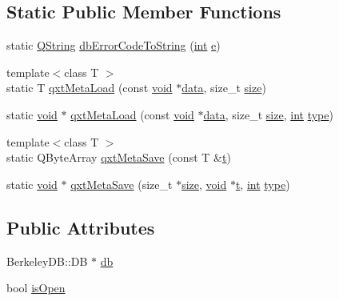 \subsection*{Static Public Member Functions}
\begin{DoxyCompactItemize}
\item 
static \hyperlink{group___u_a_v_objects_plugin_gab9d252f49c333c94a72f97ce3105a32d}{Q\-String} \hyperlink{class_qxt_bdb_a41630ef9d1adeb157e90bc645014ddec}{db\-Error\-Code\-To\-String} (\hyperlink{ioapi_8h_a787fa3cf048117ba7123753c1e74fcd6}{int} \hyperlink{_o_p_plots_8m_a9425be9aab51621e317ba7ade564b570}{e})
\item 
{\footnotesize template$<$class T $>$ }\\static T \hyperlink{class_qxt_bdb_a4a3f247160b1ed79cb0dcceacd9fb7f0}{qxt\-Meta\-Load} (const \hyperlink{group___u_a_v_objects_plugin_ga444cf2ff3f0ecbe028adce838d373f5c}{void} $\ast$\hyperlink{glext_8h_a8850df0785e6fbcc2351af3b686b8c7a}{data}, size\-\_\-t \hyperlink{glext_8h_a014d89bd76f74ef3a29c8f04b473eb76}{size})
\item 
static \hyperlink{group___u_a_v_objects_plugin_ga444cf2ff3f0ecbe028adce838d373f5c}{void} $\ast$ \hyperlink{class_qxt_bdb_a2f0bcad0f2a2de525873ee7af8876cd0}{qxt\-Meta\-Load} (const \hyperlink{group___u_a_v_objects_plugin_ga444cf2ff3f0ecbe028adce838d373f5c}{void} $\ast$\hyperlink{glext_8h_a8850df0785e6fbcc2351af3b686b8c7a}{data}, size\-\_\-t \hyperlink{glext_8h_a014d89bd76f74ef3a29c8f04b473eb76}{size}, \hyperlink{ioapi_8h_a787fa3cf048117ba7123753c1e74fcd6}{int} \hyperlink{glext_8h_a7d05960f4f1c1b11f3177dc963a45d86}{type})
\item 
{\footnotesize template$<$class T $>$ }\\static Q\-Byte\-Array \hyperlink{class_qxt_bdb_a50b3805cd1450b1f3be5e76bd3bbd7ca}{qxt\-Meta\-Save} (const T \&\hyperlink{glext_8h_a00140d6f5c548b26daf170bf16e86a6d}{t})
\item 
static \hyperlink{group___u_a_v_objects_plugin_ga444cf2ff3f0ecbe028adce838d373f5c}{void} $\ast$ \hyperlink{class_qxt_bdb_aa77852815da418ec1c49d497397ff9e1}{qxt\-Meta\-Save} (size\-\_\-t $\ast$\hyperlink{glext_8h_a014d89bd76f74ef3a29c8f04b473eb76}{size}, \hyperlink{group___u_a_v_objects_plugin_ga444cf2ff3f0ecbe028adce838d373f5c}{void} $\ast$\hyperlink{glext_8h_a00140d6f5c548b26daf170bf16e86a6d}{t}, \hyperlink{ioapi_8h_a787fa3cf048117ba7123753c1e74fcd6}{int} \hyperlink{glext_8h_a7d05960f4f1c1b11f3177dc963a45d86}{type})
\end{DoxyCompactItemize}
\subsection*{Public Attributes}
\begin{DoxyCompactItemize}
\item 
Berkeley\-D\-B\-::\-D\-B $\ast$ \hyperlink{class_qxt_bdb_a8584fa41987b8ac6a01e428f507e0d16}{db}
\item 
bool \hyperlink{class_qxt_bdb_ab03f345a4070f46d60b940f637b7ecf0}{is\-Open}
\end{DoxyCompactItemize}



